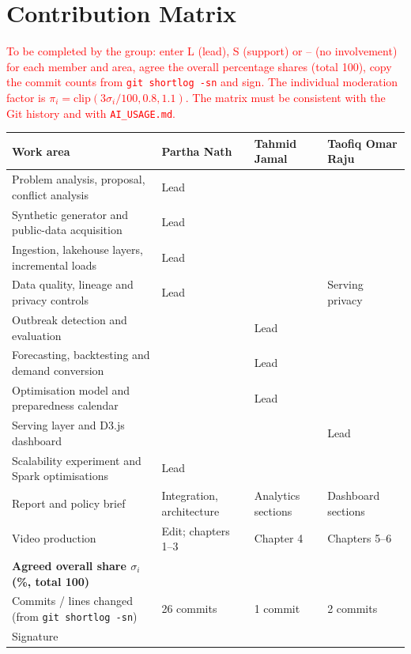 \section{Contribution Matrix}
\noindent\textcolor{red}{To be completed by the group: enter L (lead), S (support) or -- (no involvement) for each
member and area, agree the overall percentage shares (total 100), copy the commit counts from
\texttt{git shortlog -sn} and sign. The individual moderation factor is $\pi_i=\mathrm{clip}(3\sigma_i/100,0.8,1.1)$.
The matrix must be consistent with the Git history and with \texttt{AI\_USAGE.md}.}

\vspace{6pt}
\begin{center}
\renewcommand{\arraystretch}{1.5}
\begin{tabular}{|p{7.2cm}|p{2.6cm}|p{2.6cm}|p{2.6cm}|}\hline
\textbf{Work area} & \textbf{Partha Nath} & \textbf{Tahmid Jamal} & \textbf{Taofiq Omar Raju}\\\hline
Problem analysis, proposal, conflict analysis & Lead & & \\\hline
Synthetic generator and public-data acquisition & Lead & & \\\hline
Ingestion, lakehouse layers, incremental loads & Lead & & \\\hline
Data quality, lineage and privacy controls & Lead & & Serving privacy \\\hline
Outbreak detection and evaluation & & Lead & \\\hline
Forecasting, backtesting and demand conversion & & Lead & \\\hline
Optimisation model and preparedness calendar & & Lead & \\\hline
Serving layer and D3.js dashboard & & & Lead \\\hline
Scalability experiment and Spark optimisations & Lead & & \\\hline
Report and policy brief & Integration, architecture & Analytics sections & Dashboard sections \\\hline
Video production & Edit; chapters 1--3 & Chapter 4 & Chapters 5--6 \\\hline
\textbf{Agreed overall share $\sigma_i$ (\%, total 100)} & & & \\\hline
Commits / lines changed (from \texttt{git shortlog -sn}) & 26 commits & 1 commit & 2 commits \\\hline
Signature & & & \\[14pt]\hline
\end{tabular}
\end{center}

